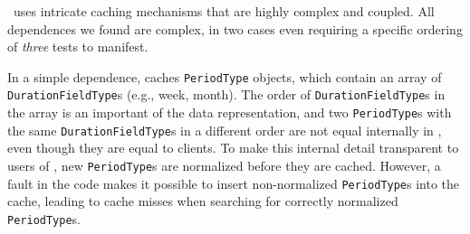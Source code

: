 

%



%

\newcommand{\periodType}{\texttt{Period\-Type}}
\newcommand{\durationFieldType}{\texttt{Duration\-Field\-Type}}
\newcommand{\forFields}{\texttt{for\-Fields}}


\jodatime\ uses intricate caching mechanisms that are high\-ly complex
and coupled.  All dependences we found are complex,
in two cases even requiring a
specific ordering of \emph{three} tests to manifest.

In a simple dependence, \jodatime{} caches \periodType{} objects, which 
contain an array of
\durationFieldType{}s (e.g., week, month). 
The order of \durationFieldType{}s in the array is an
important of the data representation, and 
two \periodType{}s with the same \durationFieldType{}s in a different
order are not equal internally in \jodatime, even though they are equal
to \jodatime clients.
To make this internal detail transparent to users of \jodatime, 
new \periodType{}s are normalized before they are cached. However, a fault in the code 
makes it possible to insert non-normalized \periodType{}s into the
cache, leading to cache misses when searching for correctly normalized
\periodType{}s.


